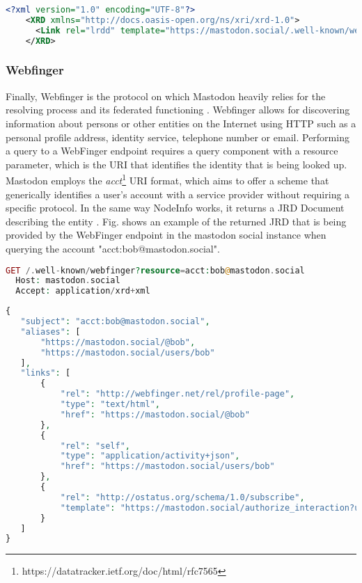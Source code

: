 \lstset{style=JSONStyle}
\begin{lstlisting}[language=XML, caption=Example Host metadata response from mastodon.social, label=fig:host_metadata_response]
    <?xml version="1.0" encoding="UTF-8"?>
    <XRD xmlns="http://docs.oasis-open.org/ns/xri/xrd-1.0">
      <Link rel="lrdd" template="https://mastodon.social/.well-known/webfinger?resource={uri}"/>
    </XRD>
\end{lstlisting}

\subsubsection{Webfinger}
Finally, Webfinger is the protocol on which Mastodon heavily relies for the resolving process and its federated functioning \cite{rochko_2020}. Webfinger allows for discovering information about persons or other entities on the Internet using HTTP such as a personal profile address, identity service, telephone number or email. Performing a query to a WebFinger endpoint requires a query component with a resource parameter, which is the URI that identifies the identity that is being looked up. Mastodon employs the \emph{acct}\footnote{https://datatracker.ietf.org/doc/html/rfc7565} URI format, which aims to offer a scheme that generically identifies a user's account with a service provider without requiring a specific protocol. In the same way NodeInfo works, it returns a JRD Document describing the entity \cite{jones_salgueiro_jones_smarr_2013}.  Fig. \label{Webfinger response from mastodon.social} shows an example of the returned JRD that is being provided by the WebFinger endpoint in the mastodon social instance when querying the account "acct:bob@mastodon.social".

\lstset{style=JSONStyle}
\begin{lstlisting}[language=PHP, caption=HTTP request to Webfinger endpoint, label=Webfinger request, float=h]
  GET /.well-known/webfinger?resource=acct:bob@mastodon.social
  Host: mastodon.social
  Accept: application/xrd+xml
\end{lstlisting}

\lstset{style=JSONStyle}
\begin{lstlisting}[language=PHP, caption=Webfinger response, label=Webfinger response from mastodon.social, float=h]
{
   "subject": "acct:bob@mastodon.social",
   "aliases": [
       "https://mastodon.social/@bob",
       "https://mastodon.social/users/bob"
   ],
   "links": [
       {
           "rel": "http://webfinger.net/rel/profile-page",
           "type": "text/html",
           "href": "https://mastodon.social/@bob"
       },
       {
           "rel": "self",
           "type": "application/activity+json",
           "href": "https://mastodon.social/users/bob"
       },
       {
           "rel": "http://ostatus.org/schema/1.0/subscribe",
           "template": "https://mastodon.social/authorize_interaction?uri={uri}"
       }
   ]
}
\end{lstlisting}


